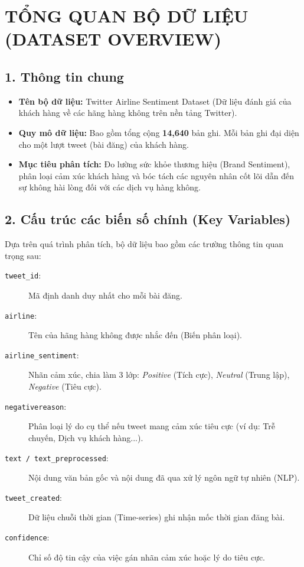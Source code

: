 \documentclass{article}
\begin{document}
\section*{TỔNG QUAN BỘ DỮ LIỆU (DATASET OVERVIEW)}

\subsection{1. Thông tin chung}
\begin{itemize}[label=--]
    \item \textbf{Tên bộ dữ liệu:} Twitter Airline Sentiment Dataset (Dữ liệu đánh giá của khách hàng về các hãng hàng không trên nền tảng Twitter).
    \item \textbf{Quy mô dữ liệu:} Bao gồm tổng cộng \textbf{14,640} bản ghi. Mỗi bản ghi đại diện cho một lượt tweet (bài đăng) của khách hàng.
    \item \textbf{Mục tiêu phân tích:} Đo lường sức khỏe thương hiệu (Brand Sentiment), phân loại cảm xúc khách hàng và bóc tách các nguyên nhân cốt lõi dẫn đến sự không hài lòng đối với các dịch vụ hàng không.
\end{itemize}

\subsection{2. Cấu trúc các biến số chính (Key Variables)}
Dựa trên quá trình phân tích, bộ dữ liệu bao gồm các trường thông tin quan trọng sau:
\begin{description}
    \item[\texttt{tweet\_id}:] Mã định danh duy nhất cho mỗi bài đăng.
    \item[\texttt{airline}:] Tên của hãng hàng không được nhắc đến (Biến phân loại).
    \item[\texttt{airline\_sentiment}:] Nhãn cảm xúc, chia làm 3 lớp: \textit{Positive} (Tích cực), \textit{Neutral} (Trung lập), \textit{Negative} (Tiêu cực).
    \item[\texttt{negativereason}:] Phân loại lý do cụ thể nếu tweet mang cảm xúc tiêu cực (ví dụ: Trễ chuyến, Dịch vụ khách hàng...).
    \item[\texttt{text / text\_preprocessed}:] Nội dung văn bản gốc và nội dung đã qua xử lý ngôn ngữ tự nhiên (NLP).
    \item[\texttt{tweet\_created}:] Dữ liệu chuỗi thời gian (Time-series) ghi nhận mốc thời gian đăng bài.
    \item[\texttt{confidence}:] Chỉ số độ tin cậy của việc gán nhãn cảm xúc hoặc lý do tiêu cực.
\end{description}
\end{document}
